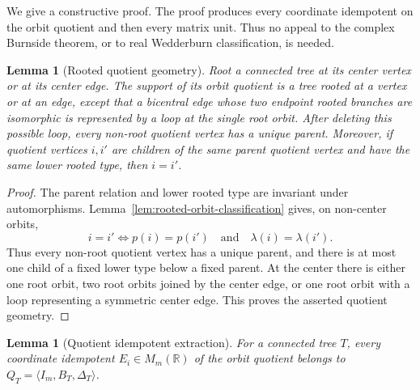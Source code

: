 \documentclass[a4paper,fleqn]{cas-sc}
\newtheorem{lemma}[theorem]{Lemma}
\theoremstyle{definition}
\theoremstyle{remark}
\newcommand{\R}{\mathbb R}
\begin{document}
We give a constructive proof.  The proof produces every coordinate idempotent on
the orbit quotient and then every matrix unit.  Thus no appeal to the complex
Burnside theorem, or to real Wedderburn classification, is needed.


\begin{lemma}[Rooted quotient geometry]
\label{lem:rooted-quotient-geometry}
Root a connected tree at its center vertex or at its center edge.  The support of
its orbit quotient is a tree rooted at a vertex or at an edge, except that a
bicentral edge whose two endpoint rooted branches are isomorphic is represented
by a loop at the single root orbit.  After deleting this possible loop, every
non-root quotient vertex has a unique parent.  Moreover, if quotient vertices
$i,i'$ are children of the same parent quotient vertex and have the same lower
rooted type, then $i=i'$.
\end{lemma}

\begin{proof}
The parent relation and lower rooted type are invariant under automorphisms.
Lemma~\ref{lem:rooted-orbit-classification} gives, on non-center orbits,
\[
        i=i'
        \Longleftrightarrow
        p(i)=p(i')\quad\text{and}\quad \lambda(i)=\lambda(i') .
\]
Thus every non-root quotient vertex has a unique parent, and there is at most one
child of a fixed lower type below a fixed parent.  At the center there is either
one root orbit, two root orbits joined by the center edge, or one root orbit with
a loop representing a symmetric center edge.  This proves the asserted quotient
geometry.
\end{proof}

\begin{lemma}[Quotient idempotent extraction]
\label{lem:quotient-idempotents}
For a connected tree \(T\), every coordinate idempotent \(E_i\in M_m(\R)\) of the
orbit quotient belongs to \(Q_T=\langle I_m,B_T,\Delta_T\rangle\).
\end{lemma}
\end{document}
